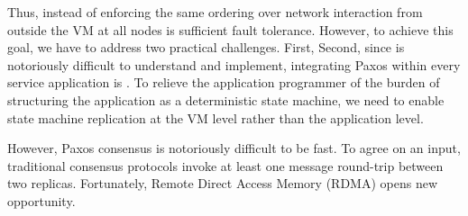 Thus, instead of 
enforcing the same ordering over network interaction from outside the VM at all nodes is 
sufficient fault tolerance. However, to achieve this goal, we have to address two practical 
challenges. First, Second, since \paxos is notoriously difficult to understand and implement, 
integrating Paxos within every service application is . To relieve the application programmer 
of the burden of structuring the application as a deterministic state machine, we need to 
enable state machine replication at the VM level rather than the application level.



However, Paxos consensus is notoriously difficult to be fast. 
To agree on an input, traditional consensus protocols invoke at least one 
message round-trip between two replicas. Fortunately, Remote Direct Access Memory (RDMA) opens new opportunity.



